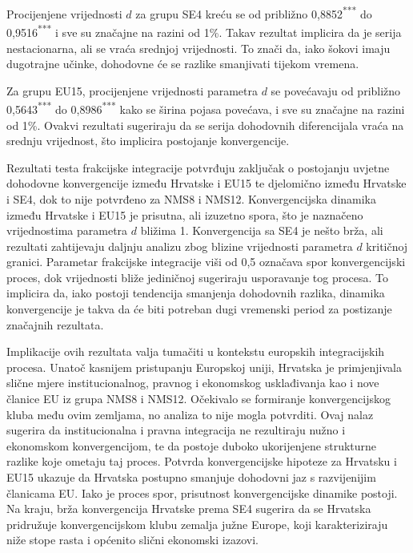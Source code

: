 \documentclass{crebsshr}
\begin{document}
Procijenjene vrijednosti $d$ za grupu SE4 kreću se od približno 0,8852\textsuperscript{***} do 0,9516\textsuperscript{***} i sve su značajne na razini od 1\%. Takav rezultat implicira da je serija nestacionarna, ali se vraća srednjoj vrijednosti. To znači da, iako šokovi imaju dugotrajne učinke, dohodovne će se razlike smanjivati tijekom vremena. 

Za grupu EU15, procijenjene vrijednosti parametra $d$ se povećavaju od približno 0,5643\textsuperscript{***} do 0,8986\textsuperscript{***} kako se širina pojasa povećava, i sve su značajne na razini od 1\%. Ovakvi rezultati sugeriraju da se serija dohodovnih diferencijala vraća na srednju vrijednost, što implicira postojanje konvergencije.

Rezultati testa frakcijske integracije potvrđuju zaključak o postojanju uvjetne dohodovne konvergencije između Hrvatske i EU15 te djelomično između Hrvatske i SE4, dok to nije potvrđeno za NMS8 i NMS12. Konvergencijska dinamika između Hrvatske i EU15 je prisutna, ali izuzetno spora, što je naznačeno vrijednostima parametra $d$ bližima 1. Konvergencija sa SE4 je nešto brža, ali rezultati zahtijevaju daljnju analizu zbog blizine vrijednosti parametra $d$ kritičnoj granici. Parametar frakcijske integracije viši od 0,5 označava spor konvergencijski proces, dok vrijednosti bliže jediničnoj sugeriraju usporavanje tog procesa. To implicira da, iako postoji tendencija smanjenja dohodovnih razlika, dinamika konvergencije je takva da će biti potreban dugi vremenski period za postizanje značajnih rezultata.

Implikacije ovih rezultata valja tumačiti u kontekstu europskih integracijskih procesa. Unatoč kasnijem pristupanju Europskoj uniji, Hrvatska je primjenjivala slične mjere institucionalnog, pravnog i ekonomskog usklađivanja kao i nove članice EU iz grupa NMS8 i NMS12. Očekivalo se formiranje konvergencijskog kluba među ovim zemljama, no analiza to nije mogla potvrditi. Ovaj nalaz sugerira da institucionalna i pravna integracija ne rezultiraju nužno i ekonomskom konvergencijom, te da postoje duboko ukorijenjene strukturne razlike koje ometaju taj proces. Potvrda konvergencijske hipoteze za Hrvatsku i EU15 ukazuje da Hrvatska postupno smanjuje dohodovni jaz s razvijenijim članicama EU. Iako je proces spor, prisutnost konvergencijske dinamike postoji. Na kraju, brža konvergencija Hrvatske prema SE4 sugerira da se Hrvatska pridružuje konvergencijskom klubu zemalja južne Europe, koji karakteriziraju niže stope rasta i općenito slični ekonomski izazovi.
\end{document}
